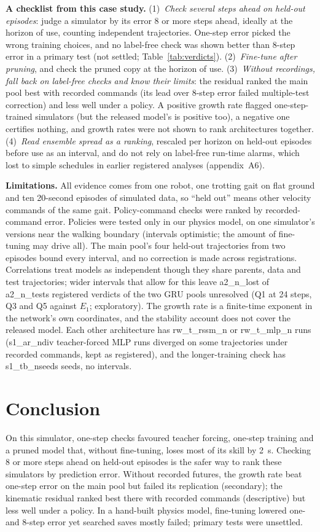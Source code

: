 \textbf{A checklist from this case study.} (1)~\emph{Check several steps ahead on held-out episodes}: judge a
simulator by its error 8 or more steps ahead, ideally at the horizon of use, counting independent trajectories.
One-step error picked the wrong training choices, and no label-free check was shown better than 8-step error in a primary test
(not settled; Table~\ref{tab:verdicts}). (2)~\emph{Fine-tune after pruning}, and check the pruned copy at the horizon of use.
(3)~\emph{Without recordings, fall back on label-free checks and know their limits}: the residual ranked the main pool
best with recorded commands (its lead over 8-step error failed multiple-test correction) and less well under a policy.
A positive growth rate flagged one-step-trained simulators (but the
released model's is positive too), a negative one certifies nothing, and growth rates were not shown to rank architectures
together. (4)~\emph{Read ensemble spread as a ranking}, rescaled per horizon on held-out episodes before use as an
interval, and do not rely on label-free run-time alarms, which lost to simple schedules in earlier registered analyses
(appendix~A6).

\textbf{Limitations.} All evidence comes from one robot, one trotting gait on flat ground and ten 20-second episodes
of simulated data, so ``held out'' means other velocity commands of the same gait. Policy-command checks were ranked by recorded-command error. Policies were tested only in our physics model,
on one simulator's versions near the walking boundary (intervals optimistic; the amount of fine-tuning may drive all). The main pool's four held-out trajectories from two episodes bound every interval, and no correction is
made across registrations. Correlations treat models as independent though they share parents, data and test
trajectories; wider intervals that allow for this leave {{a2_n_lost}} of {{a2_n_tests}} registered verdicts of the two GRU
pools unresolved (Q1 at 24 steps, Q3 and Q5 against $E_1$; exploratory). The growth rate is a finite-time exponent in the network's own coordinates, and the
stability account does not cover the released model. Each other architecture has {{rw_t_rssm_n}} or
{{rw_t_mlp_n}} runs ({{s1_ar_ndiv}} teacher-forced MLP runs diverged on some trajectories under recorded commands, kept as registered), and the longer-training check has {{s1_tb_nseeds}} seeds, no intervals.

\section{Conclusion}\label{sec:conclusion}
On this simulator, one-step checks favoured teacher forcing, one-step training and a pruned model that, without
fine-tuning, loses most of its skill by 2~s. Checking 8 or more steps ahead on held-out episodes is the safer way to rank these simulators by prediction error.
Without recorded futures, the growth rate beat one-step error on the main pool but failed its replication (secondary); the
kinematic residual ranked best there with recorded commands (descriptive) but less well under a policy. In a hand-built physics model, fine-tuning lowered one- and 8-step error yet searched saves mostly failed; primary tests were unsettled.

